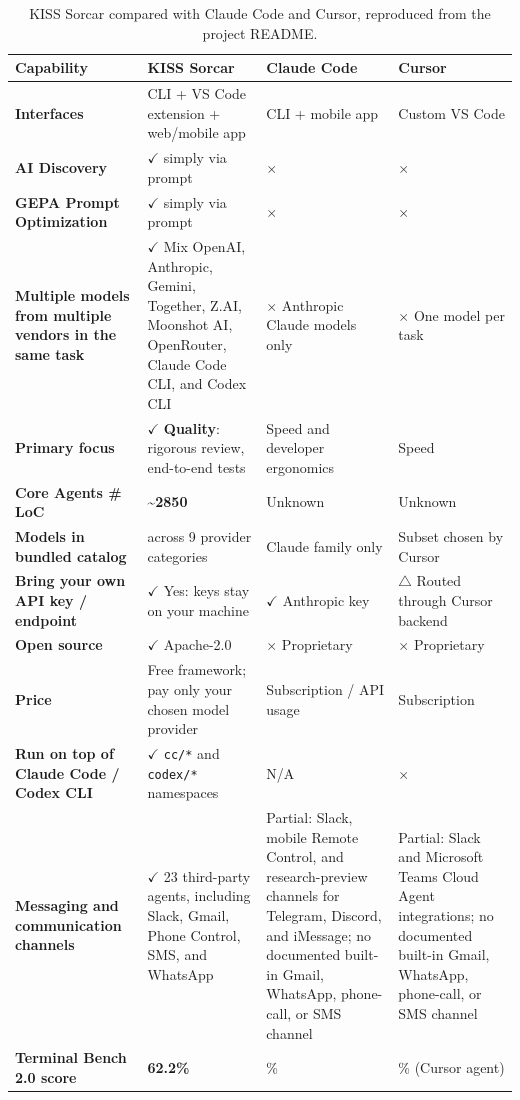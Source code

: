 \documentclass{article}
\begin{document}
\begin{table}[H]
\centering
\caption{KISS Sorcar compared with Claude Code and Cursor, reproduced from the project README.}
\label{tab:assistant-comparison}
\scriptsize
\setlength{\tabcolsep}{3pt}
\renewcommand{\arraystretch}{1.15}
\begin{tabularx}{\textwidth}{>{\raggedright\arraybackslash}p{}>{\raggedright\arraybackslash}X>{\raggedright\arraybackslash}X>{\raggedright\arraybackslash}X}
\toprule
\textbf{Capability} & \textbf{KISS Sorcar} & \textbf{Claude Code} & \textbf{Cursor} \\
\midrule
\textbf{Interfaces} & CLI + VS Code extension + web/mobile app & CLI + mobile app & Custom VS Code \\
\textbf{AI Discovery} & \(\checkmark\) simply via prompt & \(\times\) & \(\times\) \\
\textbf{GEPA Prompt Optimization} & \(\checkmark\) simply via prompt & \(\times\) & \(\times\) \\
\textbf{Multiple models from multiple vendors in the same task} & \(\checkmark\) Mix OpenAI, Anthropic, Gemini, Together, Z.AI, Moonshot AI, OpenRouter, Claude Code CLI, and Codex CLI & \(\times\) Anthropic Claude models only & \(\times\) One model per task \\
\textbf{Primary focus} & \(\checkmark\) \textbf{Quality}: rigorous review, end-to-end tests & Speed and developer ergonomics & Speed \\
\textbf{Core Agents \# LoC} & \textbf{\textasciitilde{}2850} & Unknown & Unknown \\
\textbf{Models in bundled catalog} & 531 across 9 provider categories & Claude family only & Subset chosen by Cursor \\
\textbf{Bring your own API key / endpoint} & \(\checkmark\) Yes: keys stay on your machine & \(\checkmark\) Anthropic key & \(\triangle\) Routed through Cursor backend \\
\textbf{Open source} & \(\checkmark\) Apache-2.0 & \(\times\) Proprietary & \(\times\) Proprietary \\
\textbf{Price} & Free framework; pay only your chosen model provider & Subscription / API usage & Subscription \\
\textbf{Run on top of Claude Code / Codex CLI} & \(\checkmark\) \texttt{cc/*} and \texttt{codex/*} namespaces & N/A & \(\times\) \\
\textbf{Messaging and communication channels} & \(\checkmark\) 23 third-party agents, including Slack, Gmail, Phone Control, SMS, and WhatsApp & Partial: Slack, mobile Remote Control, and research-preview channels for Telegram, Discord, and iMessage; no documented built-in Gmail, WhatsApp, phone-call, or SMS channel & Partial: Slack and Microsoft Teams Cloud Agent integrations; no documented built-in Gmail, WhatsApp, phone-call, or SMS channel \\
\textbf{Terminal Bench 2.0 score} & \textbf{62.2\%} & 58\% & 61.7\% (Cursor agent) \\
\bottomrule
\end{tabularx}
\end{table}
\end{document}
